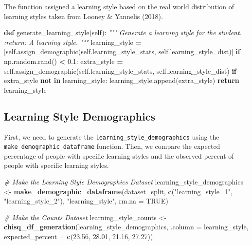 \documentclass[
  twocolumn]{article}
\newenvironment{Shaded}{\begin{snugshade}}{\end{snugshade}}
\newcommand{\AttributeTok}[1]{\textcolor[rgb]{0.13,0.29,0.53}{#1}}
\newcommand{\CommentTok}[1]{\textcolor[rgb]{0.56,0.35,0.01}{\textit{#1}}}
\newcommand{\ConstantTok}[1]{\textcolor[rgb]{0.56,0.35,0.01}{#1}}
\newcommand{\ControlFlowTok}[1]{\textcolor[rgb]{0.13,0.29,0.53}{\textbf{#1}}}
\newcommand{\FloatTok}[1]{\textcolor[rgb]{0.00,0.00,0.81}{#1}}
\newcommand{\FunctionTok}[1]{\textcolor[rgb]{0.13,0.29,0.53}{\textbf{#1}}}
\newcommand{\KeywordTok}[1]{\textcolor[rgb]{0.13,0.29,0.53}{\textbf{#1}}}
\newcommand{\NormalTok}[1]{#1}
\newcommand{\OperatorTok}[1]{\textcolor[rgb]{0.81,0.36,0.00}{\textbf{#1}}}
\newcommand{\OtherTok}[1]{\textcolor[rgb]{0.56,0.35,0.01}{#1}}
\newcommand{\StringTok}[1]{\textcolor[rgb]{0.31,0.60,0.02}{#1}}
\newcommand{\VariableTok}[1]{\textcolor[rgb]{0.00,0.00,0.00}{#1}}
\begin{document}
The function assigned a learning style based on the real world
distribution of learning styles taken from Looney \& Yannelis (2018).

\begin{Shaded}
\begin{Highlighting}[]
 \KeywordTok{def}\NormalTok{ generate\_learning\_style(}\VariableTok{self}\NormalTok{):}
        \CommentTok{"""}
\CommentTok{        Generate a learning style for the student.}
\CommentTok{        :return: A learning style.}
\CommentTok{        """}
\NormalTok{        learning\_style }\OperatorTok{=}\NormalTok{ [}\VariableTok{self}\NormalTok{.assign\_demographic(}\VariableTok{self}\NormalTok{.learning\_style\_stats, }\VariableTok{self}\NormalTok{.learning\_style\_dist)]}
        \ControlFlowTok{if}\NormalTok{ np.random.rand() }\OperatorTok{\textless{}} \FloatTok{0.1}\NormalTok{:}
\NormalTok{            extra\_style }\OperatorTok{=} \VariableTok{self}\NormalTok{.assign\_demographic(}\VariableTok{self}\NormalTok{.learning\_style\_stats, }\VariableTok{self}\NormalTok{.learning\_style\_dist)}
            \ControlFlowTok{if}\NormalTok{ extra\_style }\KeywordTok{not} \KeywordTok{in}\NormalTok{ learning\_style:}
\NormalTok{                learning\_style.append(extra\_style)}
        \ControlFlowTok{return}\NormalTok{ learning\_style}
\end{Highlighting}
\end{Shaded}

\subsection{Learning Style
Demographics}\label{learning-style-demographics}

First, we need to generate the \texttt{learning\_style\_demographics}
using the \texttt{make\_demographic\_dataframe} function. Then, we
compare the expected percentage of people with specific learning styles
and the observed percent of people with specific learning styles.

\begin{Shaded}
\begin{Highlighting}[]
\CommentTok{\# Make the Learning Style Demographics Dataset}
\NormalTok{learning\_style\_demographics }\OtherTok{\textless{}{-}} \FunctionTok{make\_demographic\_dataframe}\NormalTok{(dataset\_split, }\FunctionTok{c}\NormalTok{(}\StringTok{"learning\_style\_1"}\NormalTok{, }\StringTok{"learning\_style\_2"}\NormalTok{), }\StringTok{"learning\_style"}\NormalTok{, }\AttributeTok{rm.na =} \ConstantTok{TRUE}\NormalTok{) }

\CommentTok{\# Make the Counts Dataset}
\NormalTok{learning\_style\_counts }\OtherTok{\textless{}{-}} \FunctionTok{chisq\_df\_generation}\NormalTok{(learning\_style\_demographics, }\AttributeTok{.column =}\NormalTok{ learning\_style, }\AttributeTok{expected\_percent =} \FunctionTok{c}\NormalTok{(}\FloatTok{23.56}\NormalTok{, }\FloatTok{28.01}\NormalTok{, }\FloatTok{21.16}\NormalTok{, }\FloatTok{27.27}\NormalTok{))}
\end{Highlighting}
\end{Shaded}
\end{document}
